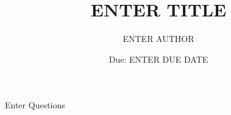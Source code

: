 \documentclass{exam} %
\theoremstyle{plain}
\theoremstyle{definition}
\theoremstyle{remark}
\numberwithin{equation}{section}  %
\begin{document}
\title{ENTER TITLE}
\author{ENTER AUTHOR}
\date{Due: ENTER DUE DATE}
\maketitle
\begin{questions}
\question Enter Questions

\end{questions}
\end{document}
